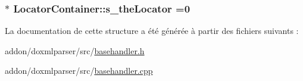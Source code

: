 \subsubsection[{s\+\_\+the\+Locator}]{ $\ast$ Locator\+Container\+::s\+\_\+the\+Locator =0\hspace{0.3cm}{\ttfamily [static]}}\label{struct_locator_container_aad414c38f6b321ec0b5907872987a92e}


La documentation de cette structure a été générée à partir des fichiers suivants \+:\begin{DoxyCompactItemize}
\item 
addon/doxmlparser/src/\hyperlink{basehandler_8h}{basehandler.\+h}\item 
addon/doxmlparser/src/\hyperlink{basehandler_8cpp}{basehandler.\+cpp}\end{DoxyCompactItemize}
